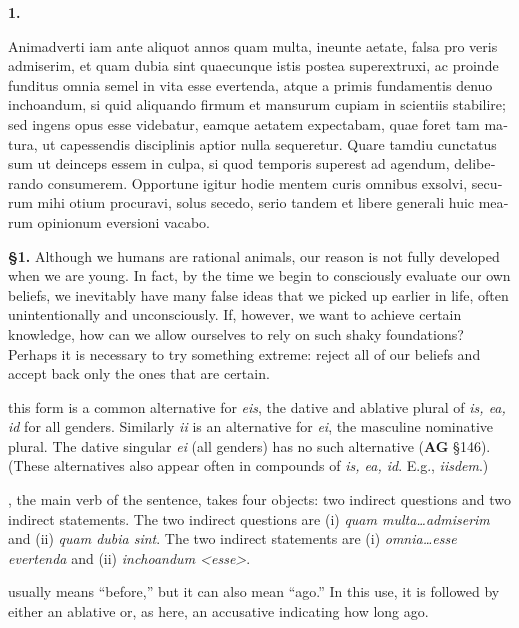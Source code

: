 \beginnumbering
\pstart
\textbf{1.} \begin{latin}Animadverti iam ante aliquot annos quam multa, ineunte aetate, falsa pro veris admiserim, et quam dubia sint quaecunque istis postea superextruxi, ac proinde funditus omnia semel in vita esse evertenda, atque a primis fundamentis denuo inchoandum, si quid aliquando firmum et mansurum cupiam in scientiis stabilire; sed ingens opus esse videbatur, eamque aetatem expectabam, quae foret tam matura, ut capessendis disciplinis aptior nulla sequeretur. Quare tamdiu cunctatus sum ut deinceps essem in culpa, si quod temporis superest ad agendum, deliberando consumerem. Opportune igitur hodie mentem curis omnibus exsolvi, securum mihi otium procuravi, solus secedo, serio tandem et libere generali huic mearum opinionum eversioni vacabo.\end{latin}
\pend
\endnumbering

\prenotes

\textbf{§1.} Although we humans are rational animals, our reason is not fully developed when we are young. In fact, by the time we begin to consciously evaluate our own beliefs, we inevitably have many false ideas that we picked up earlier in life, often unintentionally and unconsciously. If, however, we want to achieve certain knowledge, how can we allow ourselves to rely on such shaky foundations? Perhaps it is necessary to try something extreme: reject all of our beliefs and accept back only the ones that are certain.

 this form is a common alternative for \textit{eis}, the dative and ablative plural of \textit{is, ea, id} for all genders. Similarly \textit{ii} is an alternative for \textit{ei}, the masculine nominative plural. The dative singular \textit{ei} (all genders) has no such alternative (\textbf{AG} §146). (These alternatives also appear often in compounds of \textit{is, ea, id}. E.g., \textit{iisdem}.)

, the main verb of the sentence, takes four objects: two indirect questions and two indirect statements. The two indirect questions are (i) \textit{quam multa\dots admiserim} and (ii) \textit{quam dubia sint}. The two indirect statements are (i) \textit{omnia\dots esse evertenda} and (ii) \textit{inchoandum <esse>}.

 usually means ``before,'' but it can also mean ``ago.'' In this use, it is followed by either an ablative or, as here, an accusative indicating how long ago.


